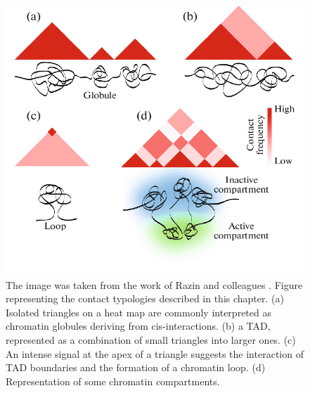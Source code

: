\begin{figure}[H]
    \includegraphics[width=0.55\linewidth]{./images/HiC-contacts.png}
    \caption{The image was taken from the work of Razin and colleagues
    \cite{razin3DGenomics2019}. Figure representing the contact typologies described in this chapter. (a) Isolated triangles on a heat map are commonly interpreted as chromatin globules deriving from cis-interactions. (b) a TAD, represented as a combination of small triangles into larger ones. (c) An intense signal at the apex of a triangle suggests the interaction of TAD boundaries and the formation of a chromatin loop. (d) Representation of some chromatin compartments.}
    \label{fig: contact typologies}
\end{figure}

